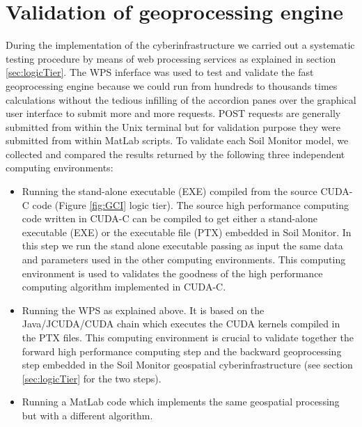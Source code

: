 \documentclass[APA,LATO1COL,doublespace]{WileyNJD-v2}
\newcommand{\update}[1]{\emph{\textcolor{blue}{#1}}}     %
\begin{document}
\section{Validation of geoprocessing engine}\label{sec:validation} %
During the implementation of the 
cyberinfrastructure we carried out a systematic testing procedure by means of web processing services as explained in section \ref{sec:logicTier}.
The WPS inferface was used to test and validate the fast geoprocessing engine because we could run from hundreds to thousands times calculations without the tedious infilling of the accordion panes over the graphical user interface to submit more and more requests.
POST requests are generally submitted from within the Unix terminal but for validation purpose they were submitted from within MatLab scripts. %
To validate each Soil Monitor model, we collected and compared the results returned by the following three independent computing environments:
\begin{itemize}
    \item Running the stand-alone executable (EXE) compiled from the source CUDA-C code (Figure \ref{fig:GCI} logic tier).
    The source high performance computing code written in CUDA-C can be compiled to get either a stand-alone executable (EXE) or the executable file (PTX) embedded in Soil Monitor.
    In this step we run the stand alone executable passing as input the same data and parameters used in the other computing environments.
    This computing environment is used to validates the goodness of the high performance computing algorithm implemented in CUDA-C.
    \item Running the WPS as explained above.
    It is based on the Java/JCUDA/CUDA chain which executes the CUDA kernels compiled in the PTX files. This computing environment is crucial to validate together the forward high performance computing step and the backward geoprocessing step embedded in the Soil Monitor geospatial cyberinfrastructure (see section \ref{sec:logicTier} for the two steps). 
    \item Running a MatLab code which implements the same geospatial processing but with a different algorithm.
\end{itemize}
\end{document}
